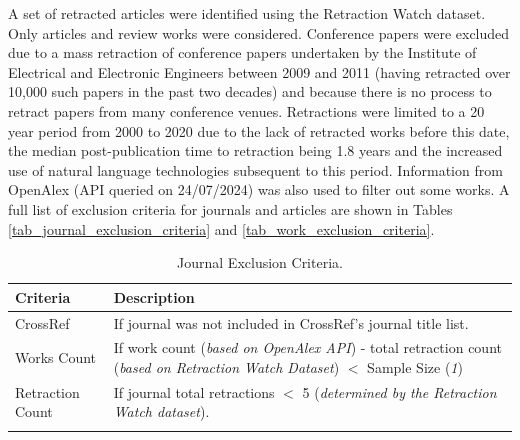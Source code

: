 \documentclass[pdflatex,sn-mathphys-num]{sn-jnl}%
\begin{document}
A set of retracted articles were identified using the Retraction Watch dataset. Only articles and review works were considered. Conference papers were excluded due to a mass retraction of conference papers undertaken by the Institute of Electrical and Electronic Engineers between 2009 and 2011 (having retracted over 10,000 such papers in the past two decades) \cite{van_noorden_more_2023} and because there is no process to retract papers from many conference venues. Retractions were limited to a 20 year period from 2000 to 2020 due to the lack of retracted works before this date, the median post-publication time to retraction being 1.8 years \cite{gaudino_trends_2021} and the increased use of natural language technologies subsequent to this period. Information from OpenAlex (API queried on 24/07/2024) was also used to filter out some works. A full list of exclusion criteria for journals and articles are shown in Tables \ref{tab_journal_exclusion_criteria} and \ref{tab_work_exclusion_criteria}.


\begin{table}
\caption{Journal Exclusion Criteria.\label{tab_journal_exclusion_criteria}}
\begin{tabularx}{\textwidth}{lX}
\toprule
\textbf{Criteria}	& \textbf{Description}\\
\midrule
CrossRef & If journal was not included in CrossRef's journal title list. \\
Works Count &  If work count (\textit{based on OpenAlex API}) - total retraction count (\textit{based on Retraction Watch Dataset}) \(<\) Sample Size (\textit{1}) \\
Retraction Count & If journal total retractions \(<\) 5 (\textit{determined by the Retraction Watch dataset}).\\

\bottomrule
    \label{tab:Journals_Criteria}
\end{tabularx}
\end{table}
\end{document}
